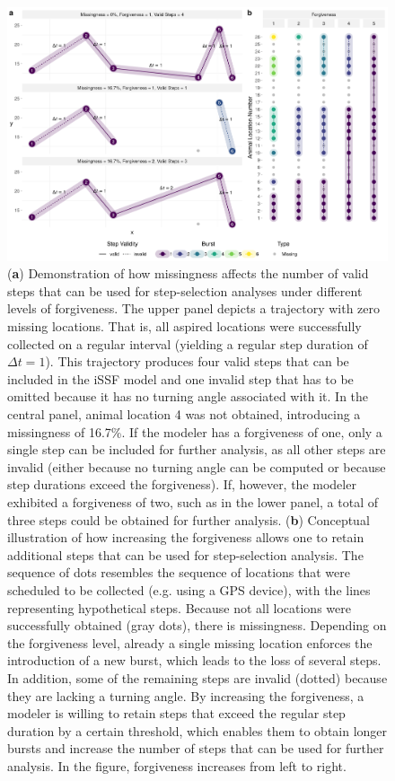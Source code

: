 \documentclass[abstract=on,10pt,a4paper,bibliography=totocnumbered]{article}
\begin{document}
\begin{figure}
  \begin{center}
  \includegraphics[width = \textwidth]{99_Overview.png}
  \caption{(\textbf{a}) Demonstration of how missingness affects the number of
  valid steps that can be used for step-selection analyses under different
  levels of forgiveness. The upper panel depicts a trajectory with zero missing
  locations. That is, all aspired locations were successfully collected on a
  regular interval (yielding a regular step duration of $\Delta t = 1$). This
  trajectory produces four valid steps that can be included in the iSSF model
  and one invalid step that has to be omitted because it has no turning angle
  associated with it. In the central panel, animal location 4 was not obtained,
  introducing a missingness of 16.7\%. If the modeler has a forgiveness of one,
  only a single step can be included for further analysis, as all other steps
  are invalid (either because no turning angle can be computed or because
  step durations exceed the forgiveness). If, however, the modeler exhibited a
  forgiveness of two, such as in the lower panel, a total of three steps could
  be obtained for further analysis. (\textbf{b}) Conceptual illustration of how
  increasing the forgiveness allows one to retain additional steps that can be
  used for step-selection analysis. The sequence of dots resembles the sequence
  of locations that were scheduled to be collected (e.g. using a GPS device),
  with the lines representing hypothetical steps. Because not all locations were
  successfully obtained (gray dots), there is missingness. Depending on the
  forgiveness level, already a single missing location enforces the introduction
  of a new burst, which leads to the loss of several steps. In addition, some of
  the remaining steps are invalid (dotted) because they are lacking a
  turning angle. By increasing the forgiveness, a modeler is willing to retain
  steps that exceed the regular step duration by a certain threshold, which
  enables them to obtain longer bursts and increase the number of steps that can
  be used for further analysis. In the figure, forgiveness increases from left
  to right.}
  \label{Overview}
  \end{center}
\end{figure}
\end{document}
